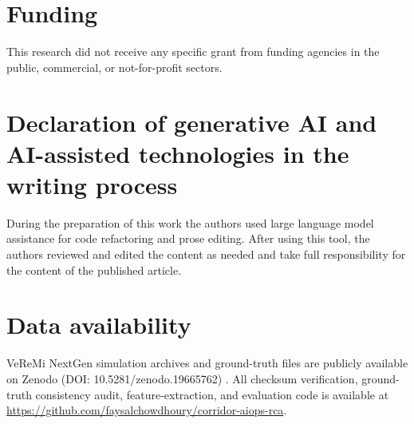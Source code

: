 \documentclass[preprint,12pt,numafflabel]{elsarticle}
\begin{document}
\section*{Funding}
This research did not receive any specific grant from funding agencies in the public, commercial, or not-for-profit sectors.

\section*{Declaration of generative AI and AI-assisted technologies in the writing process}
During the preparation of this work the authors used large language model assistance for code refactoring and prose editing. After using this tool, the authors reviewed and edited the content as needed and take full responsibility for the content of the published article.

\section*{Data availability}
VeReMi NextGen simulation archives and ground-truth files are publicly available on Zenodo (DOI: 10.5281/zenodo.19665762) \cite{veremi2026}. All checksum verification, ground-truth consistency audit, feature-extraction, and evaluation code is available at \url{https://github.com/faysalchowdhoury/corridor-aiops-rca}.

\FloatBarrier


\end{document}
